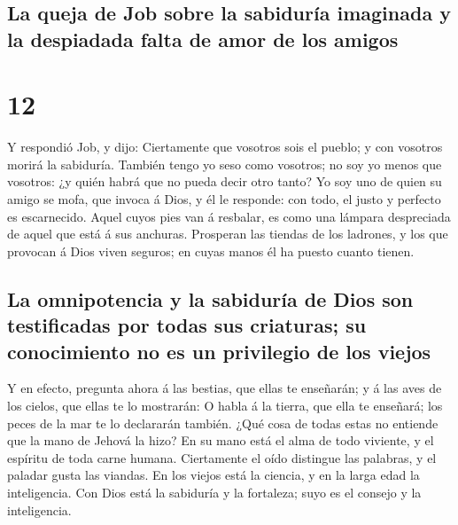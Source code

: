 \hypertarget{la-queja-de-job-sobre-la-sabiduruxeda-imaginada-y-la-despiadada-falta-de-amor-de-los-amigos}{%
\subsection{La queja de Job sobre la sabiduría imaginada y la despiadada
falta de amor de los
amigos}\label{la-queja-de-job-sobre-la-sabiduruxeda-imaginada-y-la-despiadada-falta-de-amor-de-los-amigos}}

\hypertarget{section-18-12}{%
\section{12}\label{section-18-12}}

 Y respondió Job, y dijo:  Ciertamente que
vosotros sois el pueblo; y con vosotros morirá la sabiduría.
 También tengo yo seso como vosotros; no soy yo menos que
vosotros: ¿y quién habrá que no pueda decir otro tanto? 
Yo soy uno de quien su amigo se mofa, que invoca á Dios, y él le
responde: con todo, el justo y perfecto es escarnecido. 
Aquel cuyos pies van á resbalar, es como una lámpara despreciada de
aquel que está á sus anchuras.  Prosperan las tiendas de
los ladrones, y los que provocan á Dios viven seguros; en cuyas manos él
ha puesto cuanto tienen.

\hypertarget{la-omnipotencia-y-la-sabiduruxeda-de-dios-son-testificadas-por-todas-sus-criaturas-su-conocimiento-no-es-un-privilegio-de-los-viejos}{%
\subsection{La omnipotencia y la sabiduría de Dios son testificadas por
todas sus criaturas; su conocimiento no es un privilegio de los
viejos}\label{la-omnipotencia-y-la-sabiduruxeda-de-dios-son-testificadas-por-todas-sus-criaturas-su-conocimiento-no-es-un-privilegio-de-los-viejos}}

 Y en efecto, pregunta ahora á las bestias, que ellas te
enseñarán; y á las aves de los cielos, que ellas te lo mostrarán:
 O habla á la tierra, que ella te enseñará; los peces de
la mar te lo declararán también.  ¿Qué cosa de todas estas
no entiende que la mano de Jehová la hizo?  En su mano
está el alma de todo viviente, y el espíritu de toda carne humana.
 Ciertamente el oído distingue las palabras, y el paladar
gusta las viandas.  En los viejos está la ciencia, y en
la larga edad la inteligencia.  Con Dios está la
sabiduría y la fortaleza; suyo es el consejo y la inteligencia.


